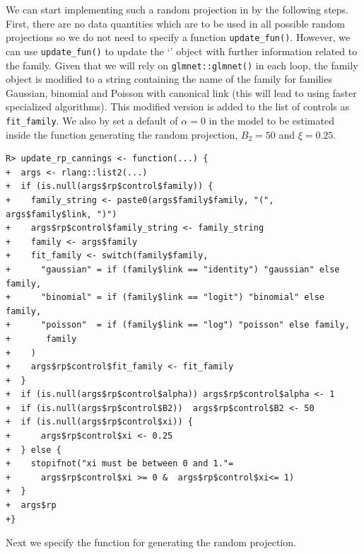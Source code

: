 \documentclass[
  article,
  nojss]{jss}
\newcommand{\class}[1]{`\code{#1}'}
\begin{document}
We can start implementing such a random projection in  by the
following steps. First, there are no data quantities which are to be
used in all possible random projections so we do not need to specify a
function \texttt{update\_fun()}. However, we can use
\texttt{update\_fun()} to update the \class{randomprojection} object
with further information related to the family. Given that we will rely
on \texttt{glmnet::glmnet()} in each loop, the family object is modified
to a string containing the name of the family for families Gaussian,
binomial and Poisson with canonical link (this will lead to using faster
specialized algorithms). This modified version is added to the list of
controls as \texttt{fit\_family}. We also by set a default of
\(\alpha = 0\) in the  model to be estimated inside the
function generating the random projection, \(B_2=50\) and \(\xi=0.25\).

\begin{verbatim}
R> update_rp_cannings <- function(...) {
+  args <- rlang::list2(...)
+  if (is.null(args$rp$control$family)) {
+    family_string <- paste0(args$family$family, "(", args$family$link, ")")
+    args$rp$control$family_string <- family_string
+    family <- args$family
+    fit_family <- switch(family$family,
+      "gaussian" = if (family$link == "identity") "gaussian" else family,
+      "binomial" = if (family$link == "logit") "binomial" else family,
+      "poisson"  = if (family$link == "log") "poisson" else family,
+       family
+    )
+    args$rp$control$fit_family <- fit_family
+  }
+  if (is.null(args$rp$control$alpha)) args$rp$control$alpha <- 1
+  if (is.null(args$rp$control$B2))  args$rp$control$B2 <- 50  
+  if (is.null(args$rp$control$xi)) {
+      args$rp$control$xi <- 0.25
+  } else {
+    stopifnot("xi must be between 0 and 1."= 
+      args$rp$control$xi >= 0 &  args$rp$control$xi<= 1)
+  }
+  args$rp
+}
\end{verbatim}

Next we specify the function for generating the random projection.
\end{document}
